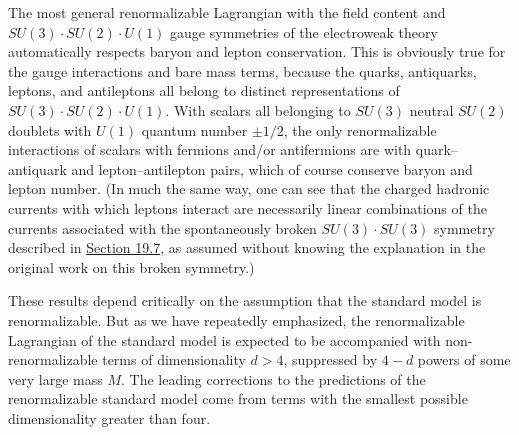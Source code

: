 The most general renormalizable Lagrangian with the field content and $SU(3)\cdot SU(2)\cdot U(1)$ gauge symmetries of the electroweak theory automatically respects baryon and lepton conservation. This is obviously true for the gauge interactions and bare mass terms, because the quarks, antiquarks, leptons, and antileptons all belong to distinct representations of $SU(3)\cdot SU(2)\cdot U(1)$. With scalars all belonging to $SU(3)$ neutral $SU(2)$ doublets with $U(1)$ quantum number $\mathbin{\pm}1/2$, the only renormalizable interactions of scalars with fermions and/or antifermions are with quark--antiquark and lepton--antilepton pairs, which of course conserve baryon and lepton number. (In much the same way, one can see that the charged hadronic currents with which leptons interact are necessarily linear combinations of the currents associated with the spontaneously broken $SU(3)\cdot SU(3)$ symmetry described in \hyperref[sec:19.7]{Section 19.7}, as assumed without knowing the explanation in the original work on this broken symmetry.)

These results depend critically on the assumption that the standard model is renormalizable. But as we have repeatedly emphasized, the renormalizable Lagrangian of the standard model is expected to be accompanied with non-renormalizable terms of dimensionality $d>4$, suppressed by $4-d$ powers of some very large mass $M$. The leading corrections to the predictions of the renormalizable standard model come from terms with the smallest possible dimensionality greater than four.

